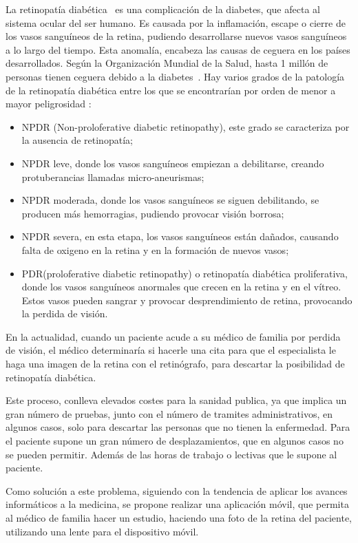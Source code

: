 La retinopatía diabética~\cite{enfermedad-ocular-diabetica} es una complicación de la diabetes, que afecta al sistema ocular del ser humano. Es causada por la inflamación, escape o cierre de los vasos sanguíneos de la retina, pudiendo desarrollarse nuevos vasos sanguíneos a lo largo del tiempo. Esta anomalía, encabeza las causas de ceguera en los países desarrollados. Según la Organización Mundial de la Salud, hasta 1 millón de personas tienen ceguera debido a la diabetes~\cite{oms-diabetes}. 
Hay varios grados de la patología de la retinopatía diabética entre los que se encontrarían por orden de menor a mayor peligrosidad \cite{grados-retinopatia}: 
\begin{itemize}
    \item NPDR (Non-proloferative diabetic retinopathy), este grado se caracteriza por la ausencia de retinopatía;
    \item NPDR leve, donde los vasos sanguíneos empiezan a debilitarse, creando protuberancias llamadas micro-aneurismas;
    \item NPDR moderada, donde los vasos sanguíneos se siguen debilitando, se producen más hemorragias, pudiendo provocar visión borrosa;
    \item NPDR severa, en esta etapa, los vasos sanguíneos están dañados, causando falta de oxigeno en la retina y en la formación de nuevos vasos;
    \item PDR(proloferative diabetic retinopathy) o retinopatía diabética proliferativa, donde los vasos sanguíneos anormales que crecen en la retina y en el vítreo. Estos vasos pueden sangrar y provocar desprendimiento de retina, provocando la perdida de visión.
\end{itemize} 


En la actualidad, cuando un paciente acude a su médico de familia por perdida de visión, el médico determinaría si hacerle una cita para que el especialista le haga una imagen de la retina con el retinógrafo, para descartar la posibilidad de retinopatía diabética.

Este proceso, conlleva elevados costes para la sanidad publica, ya que implica un gran número de pruebas, junto con el número de tramites administrativos, en algunos casos, solo para descartar las personas que no tienen la enfermedad. Para el paciente supone un gran número de desplazamientos, que en algunos casos no se pueden permitir. Además de las horas de trabajo o lectivas que le supone al paciente.

Como solución a este problema, siguiendo con la tendencia de aplicar los avances informáticos a la medicina, se propone realizar una aplicación móvil, que permita al médico de familia hacer un estudio, haciendo una foto de la retina del paciente, utilizando una lente para el dispositivo móvil. 

